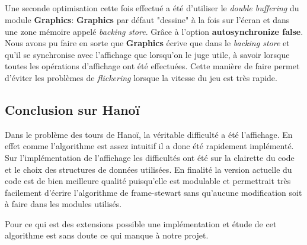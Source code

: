 \documentclass[a4paper,11pt]{article}
\begin{document}
\subparagraph{}
Une seconde optimisation cette fois effectué a été d'utiliser le \textit{double buffering} du module \textbf{Graphics}:
\textbf{Graphics} par défaut "dessine" à la fois sur l'écran et dans une zone mémoire appelé \textit{backing store}.
Grâce à l'option \textbf{autosynchronize false}.
Nous avons pu faire en sorte que \textbf{Graphics} écrive que dans le \textit{backing store} et qu'il se synchronise avec l'affichage que lorsqu'on le juge utile, à savoir lorsque toutes les opérations d'affichage ont été effectuées.
Cette manière de faire permet d'éviter les problèmes de \textit{flickering} lorsque la vitesse du jeu est très rapide.
\subsection{Conclusion sur Hanoï}
Dans le problème des tours de Hanoï, la véritable difficulté a été l'affichage. 
En effet comme l'algorithme est assez intuitif il a donc été rapidement implémenté.
Sur l'implémentation de l'affichage les difficultés ont été sur la clairette du code et le choix des structures de données utilisées.
En finalité la version actuelle du code est de bien meilleure qualité puisqu'elle est modulable et permettrait très facilement d'écrire l'algorithme de frame-stewart sans qu'aucune modification soit à faire dans les modules utilisés.

Pour ce qui est des extensions possible une implémentation et étude de cet algorithme est sans doute ce qui manque à notre projet.
 
\end{document}

